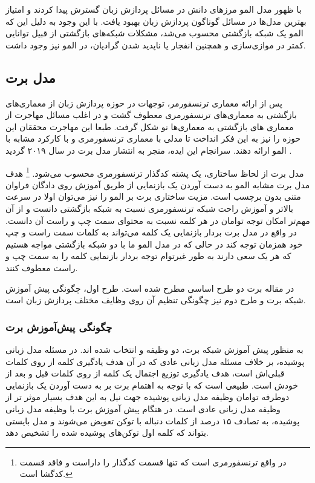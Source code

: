  با ظهور مدل المو مرز‌های دانش در مسائل پردازش زبان گسترش پیدا کردند و امتیاز بهترین مدل‌ها در مسائل گوناگون پردازش زبان بهبود یافت. با این وجود به دلیل این که المو یک شبکه بازگشتی محسوب می‌شد، مشکلات شبکه‌های بازگشتی از قبیل توانایی کمتر در موازی‌سازی و همچنین انفجار یا ناپدید شدن گرادیان، در المو نیز وجود داشت.  

\subsection{مدل برت}
پس از ارائه معماری ترنسفورمر، توجهات در حوزه پردازش زبان از معماری‌های بازگشتی به معماری‌های ترنسفورمری معطوف گشت و در اغلب مسائل مهاجرت از معماری های بازگشتی به معماری‌‌ها نو شکل گرفت. 
طبعا این مهاجرت محققان این حوزه را نیز به این فکر انداخت تا مدلی با معماری ترنسفورمری و با کارکرد مشابه با المو ارائه دهند. سرانجام این ایده، منجر به انتشار مدل برت در سال ۲۰۱۹ گردید
\cite{bert}
.

مدل برت از لحاظ ساختاری، یک پشته کدگذار ترنسفورمری محسوب می‌شود. 
\footnote{در واقع ترنسفورمری است که تنها قسمت کدگذار را داراست و فاقد قسمت کدگشا است.}
هدف مدل برت مشابه المو به دست آوردن یک بازنمایی از طریق آموزش روی دادگان فراوان متنی بدون برچسب است. مزیت ساختاری برت بر المو را نیز می‌توان اولا در سرعت بالاتر و آموزش راحت شبکه‌ ترنسفورمری نسبت به شبکه بازگشتی دانست و از آن مهم‌تر امکان توجه توامان
 در هر کلمه نسبت به محتوای سمت چپ و راست آن دانست. در واقع در مدل برت بردار بازنمایی یک کلمه می‌تواند به کلمات سمت راست و چپ خود همزمان توجه کند در حالی که در مدل المو ما با دو شبکه بازگشتی مواجه هستیم که هر یک سعی دارند به طور غیرتوام توجه بردار بازنمایی کلمه را به سمت چپ و راست معطوف کنند. 
 
 در مقاله برت دو طرح اساسی مطرح شده است. طرح اول، چگونگی پیش آموزش شبکه برت و طرح دوم نیز چگونگی تنظیم آن روی وظایف مختلف پردازش زبان است.
 
 \subsubsection{چگونگی پیش‌آموزش برت}
 به منظور پیش آموزش شبکه برت، دو وظیفه 
 و 
 انتخاب شده اند.
در مسئله مدل زبانی پوشیده، بر خلاف مسئله مدل زبانی عادی که در آن هدف یادگیری
کلمه از روی کلمات قبلی‌اش است، هدف یادگیری توزیع اجتمال یک کلمه از روی کلمات قبل و بعد از خودش است. طبیعی است که با توجه به اهتمام برت بر به دست آوردن یک بازنمایی دوطرفه توامان وظیفه مدل زبانی پوشیده جهت نیل به این هدف بسیار موثر تر از وظیفه مدل زبانی عادی است. در هنگام پیش آموزش برت با وظیفه مدل زبانی پوشیده، به تصادف ۱۵ درصد از کلمات دنباله با توکن 
تعویض می‌شوند و مدل بایستی بتواند که کلمه اول توکن‌های پوشیده شده را تشخیص دهد. 

